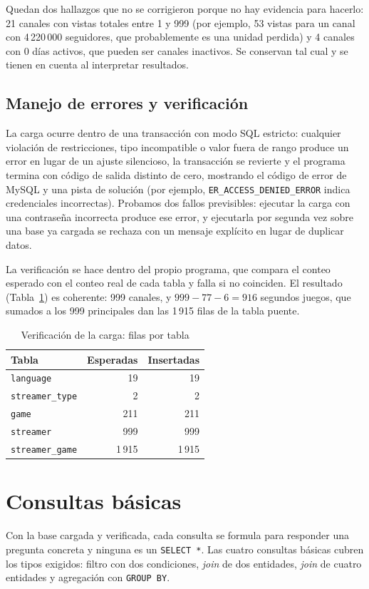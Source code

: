 \documentclass[conference]{IEEEtran}
\begin{document}
Quedan dos hallazgos que no se corrigieron porque no hay evidencia para hacerlo: 21 canales con vistas totales entre 1 y 999 (por ejemplo, 53 vistas para un canal con 4\,220\,000 seguidores, que probablemente es una unidad perdida) y 4 canales con 0 días activos, que pueden ser canales inactivos. Se conservan tal cual y se tienen en cuenta al interpretar resultados.

\subsection{Manejo de errores y verificación}
La carga ocurre dentro de una transacción con modo SQL estricto: cualquier violación de restricciones, tipo incompatible o valor fuera de rango produce un error en lugar de un ajuste silencioso, la transacción se revierte y el programa termina con código de salida distinto de cero, mostrando el código de error de MySQL y una pista de solución (por ejemplo, \texttt{ER\_ACCESS\_DENIED\_ERROR} indica credenciales incorrectas). Probamos dos fallos previsibles: ejecutar la carga con una contraseña incorrecta produce ese error, y ejecutarla por segunda vez sobre una base ya cargada se rechaza con un mensaje explícito en lugar de duplicar datos.

La verificación se hace dentro del propio programa, que compara el conteo esperado con el conteo real de cada tabla y falla si no coinciden. El resultado (Tabla~\ref{tab:counts}) es coherente: 999 canales, y $999-77-6=916$ segundos juegos, que sumados a los 999 principales dan las 1\,915 filas de la tabla puente.

\begin{table}[!t]
\caption{Verificación de la carga: filas por tabla}
\label{tab:counts}
\centering
\footnotesize
\begin{tabular}{@{}lrr@{}}
\toprule
Tabla & Esperadas & Insertadas \\
\midrule
\texttt{language} & 19 & 19 \\
\texttt{streamer\_type} & 2 & 2 \\
\texttt{game} & 211 & 211 \\
\texttt{streamer} & 999 & 999 \\
\texttt{streamer\_game} & 1\,915 & 1\,915 \\
\bottomrule
\end{tabular}
\end{table}

\section{Consultas básicas}
Con la base cargada y verificada, cada consulta se formula para responder una pregunta concreta y ninguna es un \texttt{SELECT *}. Las cuatro consultas básicas cubren los tipos exigidos: filtro con dos condiciones, \emph{join} de dos entidades, \emph{join} de cuatro entidades y agregación con \texttt{GROUP BY}.
\end{document}
